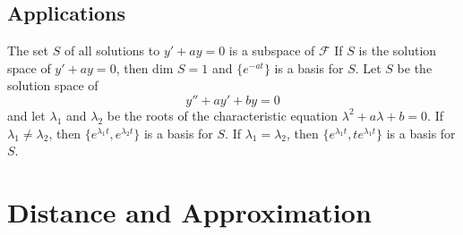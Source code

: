 \documentclass{article}
\begin{document}
        \subsection{Applications}
        \begin{outline}
            \1 The set $S$ of all solutions to \(y'+ay=0\) is a subspace of \(\mathscr F\)
            \1 If $S$ is the solution space of \(y'+ay=0\), then \(\text{dim }S=1\) and \(\{e^{-at}\}\) is a basis for $S$. 
            \1 Let $S$ be the solution space of \[y''+ay'+by=0\] and let \(\lambda_1\) and \(\lambda_2\) be the roots of the characteristic equation \(\lambda^2+a\lambda+b=0\). 
                \2 If \(\lambda_1\neq\lambda_2\), then \(\{e^{\lambda_1t},e^{\lambda_2t}\}\) is a basis for $S$. 
                \2 If \(\lambda_1=\lambda_2\), then \(\{e^{\lambda_1t},te^{\lambda_1t}\}\) is a basis for $S$. 

        \end{outline}
    \section{Distance and Approximation} %
\end{document}
